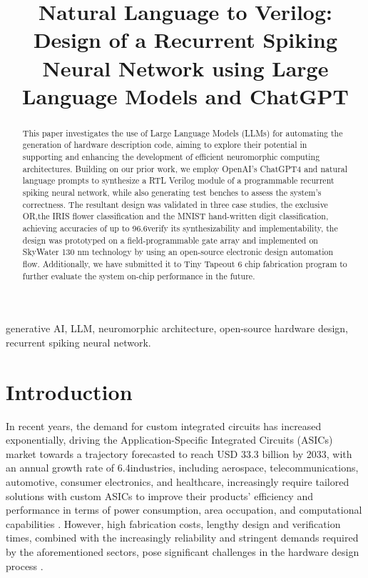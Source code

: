 
\title{Natural Language to Verilog: Design of a Recurrent Spiking Neural Network using Large Language Models and ChatGPT
}
\maketitle

\begin{abstract}
This paper investigates the use of Large Language Models (LLMs) for automating the generation of hardware description code, aiming to explore their potential in supporting and enhancing the development of efficient neuromorphic computing architectures.
Building on our prior work, we employ OpenAI's ChatGPT4 and natural language prompts to synthesize a RTL Verilog module of a programmable recurrent spiking neural network, while also generating test benches to assess the system's correctness.
The resultant design was validated in three case studies, the exclusive OR,the IRIS flower classification and the MNIST hand-written digit classification, achieving accuracies of up to 96.6\To verify its synthesizability and implementability, the design was prototyped on a field-programmable gate array and implemented on SkyWater 130 nm technology by using an open-source electronic design automation flow.
Additionally, we have submitted it to Tiny Tapeout 6 chip fabrication program to further evaluate the system on-chip performance in the future.




\end{abstract}

\begin{IEEEkeywords}
generative AI, LLM, neuromorphic architecture, open-source hardware design, recurrent spiking neural network.
\end{IEEEkeywords}

\section{Introduction}
In recent years, the demand for custom integrated circuits has increased exponentially, driving the Application-Specific Integrated Circuits (ASICs) market towards a trajectory forecasted to reach USD 33.3 billion by 2033, with an annual growth rate of 6.4\Various industries, including aerospace, telecommunications, automotive, consumer electronics, and healthcare, increasingly require tailored solutions with custom ASICs to improve their products' efficiency and performance in terms of power consumption, area occupation, and computational capabilities \cite{2024_asic_market_us_full_report,hybrid}.
However, high fabrication costs, lengthy design and verification times, combined with the increasingly reliability and stringent demands required by the aforementioned sectors, pose significant challenges in the hardware design process \cite{2018_chip_development}.

